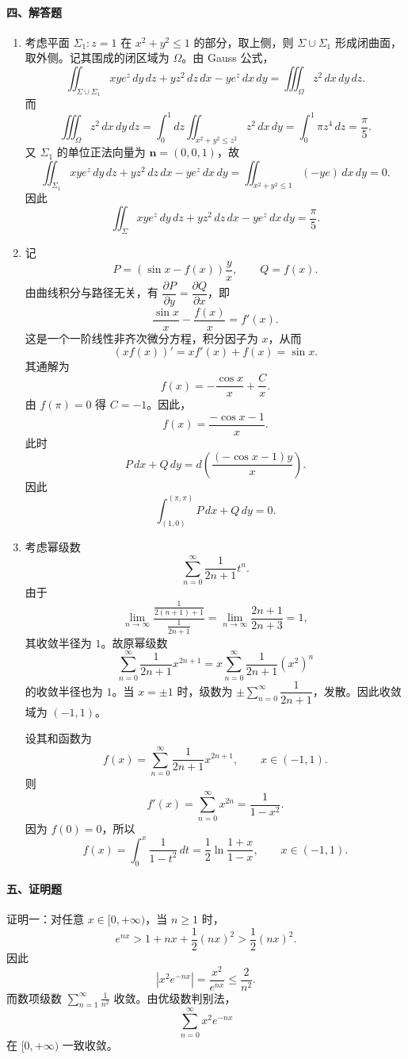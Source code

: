 \paragraph*{四、解答题}
\begin{enumerate}
  \item 考虑平面 $\Sigma_1:z=1$ 在 $x^2+y^2\le 1$ 的部分，取上侧，则 $\Sigma\cup\Sigma_1$ 形成闭曲面，取外侧。记其围成的闭区域为 $\Omega$。由 Gauss 公式，
  \[
    \iint_{\Sigma\cup\Sigma_1} xye^z\,dy\,dz+yz^2\,dz\,dx-ye^z\,dx\,dy
    =\iiint_{\Omega}z^2\,dx\,dy\,dz.
  \]
  而
  \[
    \iiint_{\Omega}z^2\,dx\,dy\,dz
    =\int_0^1 dz\iint_{x^2+y^2\le z^2}z^2\,dx\,dy
    =\int_0^1\pi z^4\,dz=\frac{\pi}{5}.
  \]
  又 $\Sigma_1$ 的单位正法向量为 $\mathbf n=(0,0,1)$，故
  \[
    \iint_{\Sigma_1} xye^z\,dy\,dz+yz^2\,dz\,dx-ye^z\,dx\,dy
    =\iint_{x^2+y^2\le 1}(-ye)\,dx\,dy=0.
  \]
  因此
  \[
    \iint_{\Sigma} xye^z\,dy\,dz+yz^2\,dz\,dx-ye^z\,dx\,dy
    =\frac{\pi}{5}.
  \]

  \item 记
  \[
    P=\left(\sin x-f(x)\right)\frac{y}{x},\qquad Q=f(x).
  \]
  由曲线积分与路径无关，有 $\dfrac{\partial P}{\partial y}=\dfrac{\partial Q}{\partial x}$，即
  \[
    \frac{\sin x}{x}-\frac{f(x)}{x}=f'(x).
  \]
  这是一个一阶线性非齐次微分方程，积分因子为 $x$，从而
  \[
    (xf(x))'=xf'(x)+f(x)=\sin x.
  \]
  其通解为
  \[
    f(x)=-\frac{\cos x}{x}+\frac{C}{x}.
  \]
  由 $f(\pi)=0$ 得 $C=-1$。因此，
  \[
    f(x)=\frac{-\cos x-1}{x}.
  \]
  此时
  \[
    P\,dx+Q\,dy
    =d\left(\frac{(-\cos x-1)y}{x}\right).
  \]
  因此
  \[
    \int_{(1,0)}^{(\pi,\pi)}P\,dx+Q\,dy=0.
  \]

  \item 考虑幂级数
  \[
    \sum_{n=0}^{\infty}\frac{1}{2n+1}t^n.
  \]
  由于
  \[
    \lim_{n\to\infty}
    \frac{\frac{1}{2(n+1)+1}}{\frac{1}{2n+1}}
    =\lim_{n\to\infty}\frac{2n+1}{2n+3}=1,
  \]
  其收敛半径为 $1$。故原幂级数
  \[
    \sum_{n=0}^{\infty}\frac{1}{2n+1}x^{2n+1}
    =x\sum_{n=0}^{\infty}\frac{1}{2n+1}(x^2)^n
  \]
  的收敛半径也为 $1$。当 $x=\pm1$ 时，级数为 $\pm\sum_{n=0}^{\infty}\dfrac{1}{2n+1}$，发散。因此收敛域为 $(-1,1)$。

  设其和函数为
  \[
    f(x)=\sum_{n=0}^{\infty}\frac{1}{2n+1}x^{2n+1},\qquad x\in(-1,1).
  \]
  则
  \[
    f'(x)=\sum_{n=0}^{\infty}x^{2n}=\frac{1}{1-x^2}.
  \]
  因为 $f(0)=0$，所以
  \[
    f(x)=\int_0^x\frac{1}{1-t^2}\,dt
    =\frac12\ln\frac{1+x}{1-x},\qquad x\in(-1,1).
  \]
\end{enumerate}

\paragraph*{五、证明题}
证明一：对任意 $x\in[0,+\infty)$，当 $n\ge 1$ 时，
\[
  e^{nx}>1+nx+\frac12(nx)^2>\frac12(nx)^2.
\]
因此
\[
  |x^2e^{-nx}|=\frac{x^2}{e^{nx}}\le \frac{2}{n^2}.
\]
而数项级数 $\displaystyle \sum_{n=1}^{\infty}\frac{1}{n^2}$ 收敛。由优级数判别法，
\[
  \sum_{n=0}^{\infty}x^2e^{-nx}
\]
在 $[0,+\infty)$ 一致收敛。

